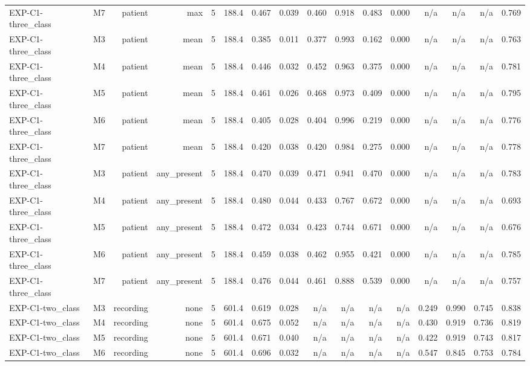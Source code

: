 \begin{table}[htbp]
\begin{tabular}{lrrrrrrrrrrrrrrr}
    EXP-C1-three\_class & M7 & patient & max & 5 & 188.4 & 0.467 & 0.039 & 0.460 & 0.918 & 0.483 & 0.000 & n/a & n/a & n/a & 0.769 \\
    EXP-C1-three\_class & M3 & patient & mean & 5 & 188.4 & 0.385 & 0.011 & 0.377 & 0.993 & 0.162 & 0.000 & n/a & n/a & n/a & 0.763 \\
    EXP-C1-three\_class & M4 & patient & mean & 5 & 188.4 & 0.446 & 0.032 & 0.452 & 0.963 & 0.375 & 0.000 & n/a & n/a & n/a & 0.781 \\
    EXP-C1-three\_class & M5 & patient & mean & 5 & 188.4 & 0.461 & 0.026 & 0.468 & 0.973 & 0.409 & 0.000 & n/a & n/a & n/a & 0.795 \\
    EXP-C1-three\_class & M6 & patient & mean & 5 & 188.4 & 0.405 & 0.028 & 0.404 & 0.996 & 0.219 & 0.000 & n/a & n/a & n/a & 0.776 \\
    EXP-C1-three\_class & M7 & patient & mean & 5 & 188.4 & 0.420 & 0.038 & 0.420 & 0.984 & 0.275 & 0.000 & n/a & n/a & n/a & 0.778 \\
    EXP-C1-three\_class & M3 & patient & any\_present & 5 & 188.4 & 0.470 & 0.039 & 0.471 & 0.941 & 0.470 & 0.000 & n/a & n/a & n/a & 0.783 \\
    EXP-C1-three\_class & M4 & patient & any\_present & 5 & 188.4 & 0.480 & 0.044 & 0.433 & 0.767 & 0.672 & 0.000 & n/a & n/a & n/a & 0.693 \\
    EXP-C1-three\_class & M5 & patient & any\_present & 5 & 188.4 & 0.472 & 0.034 & 0.423 & 0.744 & 0.671 & 0.000 & n/a & n/a & n/a & 0.676 \\
    EXP-C1-three\_class & M6 & patient & any\_present & 5 & 188.4 & 0.459 & 0.038 & 0.462 & 0.955 & 0.421 & 0.000 & n/a & n/a & n/a & 0.785 \\
    EXP-C1-three\_class & M7 & patient & any\_present & 5 & 188.4 & 0.476 & 0.044 & 0.461 & 0.888 & 0.539 & 0.000 & n/a & n/a & n/a & 0.757 \\
    EXP-C1-two\_class & M3 & recording & none & 5 & 601.4 & 0.619 & 0.028 & n/a & n/a & n/a & n/a & 0.249 & 0.990 & 0.745 & 0.838 \\
    EXP-C1-two\_class & M4 & recording & none & 5 & 601.4 & 0.675 & 0.052 & n/a & n/a & n/a & n/a & 0.430 & 0.919 & 0.736 & 0.819 \\
    EXP-C1-two\_class & M5 & recording & none & 5 & 601.4 & 0.671 & 0.040 & n/a & n/a & n/a & n/a & 0.422 & 0.919 & 0.743 & 0.817 \\
    EXP-C1-two\_class & M6 & recording & none & 5 & 601.4 & 0.696 & 0.032 & n/a & n/a & n/a & n/a & 0.547 & 0.845 & 0.753 & 0.784 \\

\end{tabular}
\end{table}
